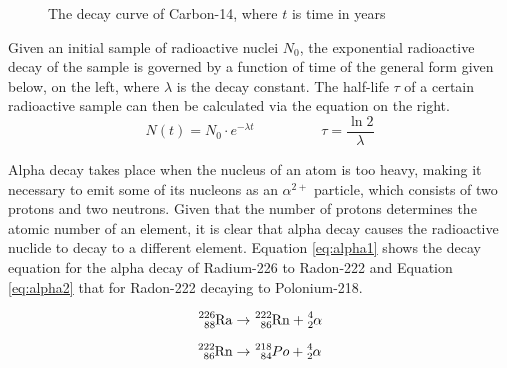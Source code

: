\begin{figure}[h!]
\centering
\caption{The decay curve of Carbon-14, where $t$ is time in years}
\label{fig:decay}
\end{figure}

Given an initial sample of radioactive nuclei $N_0$, the exponential radioactive decay of the sample is governed by a function of time of the general form given below, on the left, where $\lambda$ is the decay constant. The half-life $\tau$ of a certain radioactive sample can then be calculated via the equation on the right. $$N(t) = N_0 \cdot e^{-\lambda t} \hspace{2cm} \tau = \frac{\ln 2}{\lambda}$$


Alpha decay takes place when the nucleus of an atom is too heavy, making it necessary to emit some of its nucleons as an $\alpha^{2+}$ particle, which consists of two protons and two neutrons. Given that the number of protons determines the atomic number of an element, it is clear that alpha decay causes the radioactive nuclide to decay to a different element. Equation \ref{eq:alpha1} shows the decay equation for the alpha decay of Radium-226 to Radon-222 and Equation \ref{eq:alpha2} that for Radon-222 decaying to Polonium-218.

\begin{equation}
  \ce{^{226}_{88}Ra} \rightarrow \ce{^{222}_{86}Rn} + \ce{^{4}_{2}\alpha}
  \label{eq:alpha1}
\end{equation}

\begin{equation}
  \ce{^{222}_{86}Rn} \rightarrow \ce{^{218}_{84}{Po}} + \ce{^{4}_{2}\alpha}
  \label{eq:alpha2}
\end{equation}

